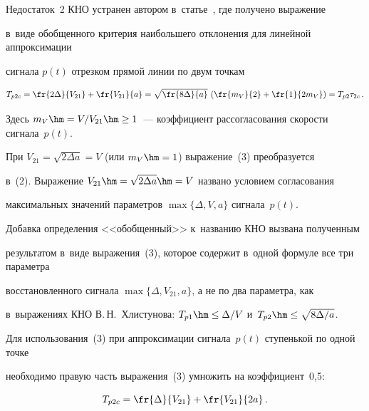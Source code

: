   


  Недостаток~2 КНО устранен автором в~статье~\cite{14-m}, где получено выражение 


в~виде обобщенного критерия наибольшего отклонения для линейной аппроксимации 


сигнала $p(t)$ отрезком прямой линии по двум точкам 


  \begin{equation}


  T_{p2c}=\fr{2\Delta}{V_{21}}+\fr{V_{21}}{a}=\sqrt{\fr{8\Delta}{a}}\,\left( 


\fr{m_V}{2}+\fr{1}{2m_V}\right) =T_{p2}\tau_{2c}\,.


  \label{e3-m}


  \end{equation}


Здесь $m_V\hm = V/V_{21}\hm\geq 1$~--- коэффициент рассогласования скорости сигнала~$p(t)$.





  При $V_{21}=\sqrt{2\Delta a}=V$ (или $m_V\hm=1$) выражение~(3) преобразуется 


в~(2). Выражение $V_{21}\hm=\sqrt{2\Delta a}\hm=V$ названо условием согласования 


максимальных значений параметров $\max\{\Delta, V, a\}$ сигнала~$p(t)$.


  


  Добавка определения <<обобщенный>> к~названию КНО вызвана полученным 


результатом в~виде выражения~(3), которое содержит в~одной формуле все три параметра 


восстановленного сигнала $\max\{\Delta, V_{21}, a\}$, а не по два параметра, как 


в~выражениях КНО В.\,Н.~Хлистунова: $T_{p1}\hm\leq \Delta/V$ и~$T_{p2}\hm\leq 


\sqrt{8\Delta/a}$.


  


  Для использования~(3) при аппроксимации сигнала~$p(t)$ ступенькой по одной точке 


необходимо правую часть выражения~(3) умножить на коэффициент~0,5:


  \begin{equation}


  T_{p2c}=\fr{\Delta}{V_{21}}+\fr{V_{21}}{2a}\,.


  \label{e4-m}


  \end{equation}



